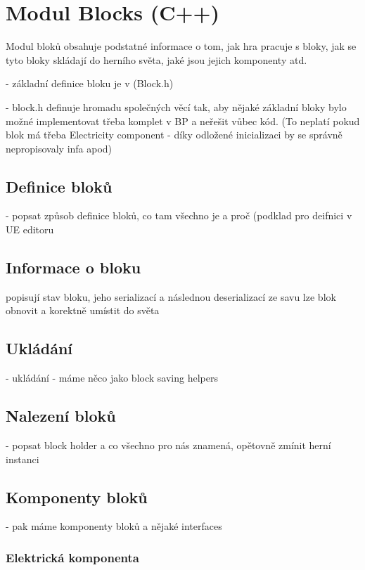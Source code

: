 
\section{Modul Blocks (C++)}

Modul bloků obsahuje podstatné informace o tom, jak hra pracuje s bloky, jak se tyto bloky skládají do herního světa, jaké jsou jejich komponenty atd. 

- základní definice bloku je v (Block.h)

- block.h definuje hromadu společných věcí tak, aby nějaké základní bloky bylo možné implementovat třeba komplet v BP a neřešit vůbec kód. (To neplatí pokud blok má třeba Electricity component - díky odložené inicializaci by se správně nepropisovaly infa apod)



\subsection{Definice bloků}
- popsat způsob definice bloků, co tam všechno je a proč (podklad pro deifnici v UE editoru

\subsection{Informace o bloku}
popisují stav bloku, jeho serializací a následnou deserializací ze savu lze blok obnovit a korektně umístit do světa


\subsection{Ukládání}

- ukládání - máme něco jako block saving helpers


\subsection{Nalezení bloků}
- popsat block holder a co všechno pro nás znamená, opětovně zmínit herní instanci


\subsection{Komponenty bloků}
- pak máme komponenty bloků a nějaké interfaces

\subsubsection{Elektrická komponenta}


